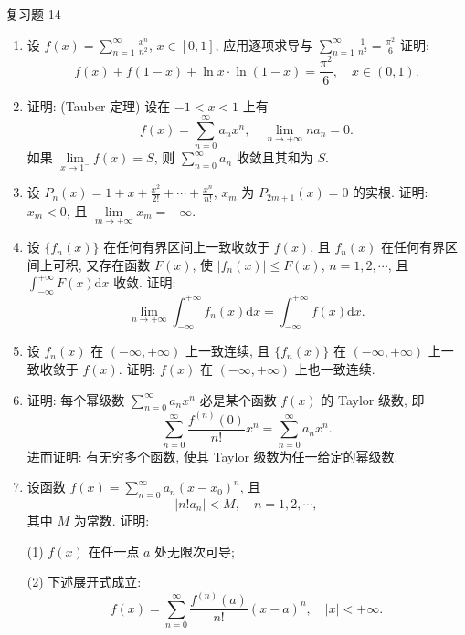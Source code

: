 \begin{exblock}{复习题 14}
\begin{enumerate}
  证明: 在 $(-\infty,+\infty)$ 上, $f(x)=0$.
  \item 设 $f(x)=\displaystyle\sum_{n=1}^{\infty}\frac{x^{n}}{n^{2}}$, $x\in[0,1]$, 应用逐项求导与 $\sum_{n=1}^{\infty}\frac{1}{n^{2}}=\frac{\pi^{2}}{6}$ 证明:
  \[
    f(x)+f(1-x)+\ln x\cdot\ln(1-x)=\frac{\pi^{2}}{6},\quad x\in(0,1).
\]
  \item 证明: (Tauber 定理) 设在 $-1<x<1$ 上有
  \[
    f(x)=\sum_{n=0}^{\infty}a_{n}x^{n},\quad\lim_{n\to+\infty}na_{n}=0.
\]
  如果 $\lim\limits_{x\to1^{-}}f(x)=S$, 则 $\sum_{n=0}^{\infty}a_{n}$ 收敛且其和为 $S$.
  \item 设 $P_{n}(x)=1+x+\frac{x^{2}}{2!}+\cdots+\frac{x^{n}}{n!}$, $x_{m}$ 为 $P_{2m+1}(x)=0$ 的实根. 证明: $x_{m}<0$, 且 $\lim\limits_{m\to+\infty}x_{m}=-\infty$.
  \item 设 $\{f_{n}(x)\}$ 在任何有界区间上一致收敛于 $f(x)$, 且 $f_{n}(x)$ 在任何有界区间上可积, 又存在函数 $F(x)$, 使 $|f_{n}(x)|\leqslant F(x)$, $n=1,2,\cdots$, 且 $\displaystyle\int_{-\infty}^{+\infty}F(x)\mathrm{d}x$ 收敛. 证明:
  \[
    \lim_{n\to+\infty}\int_{-\infty}^{+\infty}f_{n}(x)\mathrm{d}x=\int_{-\infty}^{+\infty}f(x)\mathrm{d}x.
\]
  \item 设 $f_{n}(x)$ 在 $(-\infty,+\infty)$ 上一致连续, 且 $\{f_{n}(x)\}$ 在 $(-\infty,+\infty)$ 上一致收敛于 $f(x)$. 证明: $f(x)$ 在 $(-\infty,+\infty)$ 上也一致连续.
  \item 证明: 每个幂级数 $\sum_{n=0}^{\infty}a_{n}x^{n}$ 必是某个函数 $f(x)$ 的 Taylor 级数, 即
  \[
    \sum_{n=0}^{\infty}\frac{f^{(n)}(0)}{n!}x^{n}=\sum_{n=0}^{\infty}a_{n}x^{n}.
\]
  进而证明: 有无穷多个函数, 使其 Taylor 级数为任一给定的幂级数.
  \item 设函数 $f(x)=\sum_{n=0}^{\infty}a_{n}(x-x_{0})^{n}$, 且
  \[
    |n!a_{n}|<M,\quad n=1,2,\cdots,
\]
  其中 $M$ 为常数. 证明:

  (1) $f(x)$ 在任一点 $a$ 处无限次可导;

  (2) 下述展开式成立:
  \[
    f(x)=\sum_{n=0}^{\infty}\frac{f^{(n)}(a)}{n!}(x-a)^{n},\quad|x|<+\infty.
\]
\end{enumerate}
\end{exblock}
